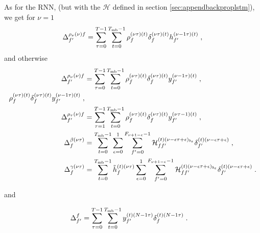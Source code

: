 As for the RNN, (but with the $\mathcal{H}$ defined in section \ref{sec:appendbackproplstm}), we get for $\nu=1$
\begin{align}
\Delta^{\rho_\nu(\nu)f}_{f'}&=\sum_{\tau=0}^{T-1}\sum_{t=0}^{T_{{\rm mb}}-1}
%
\rho^{(\nu\tau)(t)}_{f}\delta^{(\nu\tau)(t)}_{f}h^{(\nu-1\tau)(t)}_{f'}\;,\\
\end{align}
and otherwise
\begin{align}
\Delta^{\rho_\nu(\nu)f}_{f'}&=\sum_{\tau=0}^{T-1}\sum_{t=0}^{T_{{\rm mb}}-1}
%
\rho^{(\nu\tau)(t)}_{f}\delta^{(\nu\tau)(t)}_{f}y^{(\nu-1\tau)(t)}_{f'}\;,\\
%
\rho^{(\nu\tau)(t)}_{f}\delta^{(\nu\tau)(t)}_{f}y^{(\nu-1\tau)(t)}_{f'}\;,\\
%
\Delta^{\rho_\tau(\nu)f}_{f'}&=\sum_{\tau=1}^{T-1}\sum_{t=0}^{T_{{\rm mb}}-1}
%
\rho^{(\nu\tau)(t)}_{f}\delta^{(\nu\tau)(t)}_{f}y^{(\nu\tau-1)(t)}_{f'}\;,\\
%
\Delta^{\beta(\nu \tau)}_{f}&=\sum_{t=0}^{T_{{\rm mb}}-1}\sum_{\epsilon=0}^{1}\sum_{f'=0}^{F_{\nu+1-\epsilon}-1}
%
\mathcal{H}^{(t)(\nu-\epsilon\tau+\epsilon)_{b_\epsilon}}_{ff'}\delta^{(t)(\nu-\epsilon\tau+\epsilon)}_{f'}\;,\\
%
\Delta^{\gamma(\nu \tau)}_{f}&=\sum_{t=0}^{T_{{\rm mb}}-1}\tilde{h}^{(t)(\nu\tau)}_{f}\sum_{\epsilon=0}^{1}\sum_{f'=0}^{F_{\nu+1-\epsilon}-1}
%
\mathcal{H}^{(t)(\nu-\epsilon\tau+\epsilon)_{b_\epsilon}}_{ff'}\delta^{(t)(\nu-\epsilon\tau+\epsilon)}_{f'}\;.
\end{align}

and

\begin{align}
\Delta^{f}_{f'}&=\sum_{\tau=0}^{T-1}\sum_{t=0}^{T_{{\rm mb}}-1} y^{(t)(N-1\tau)}_{f'}\delta^{(t)(N-1\tau)}_{f}\;.
\end{align}


